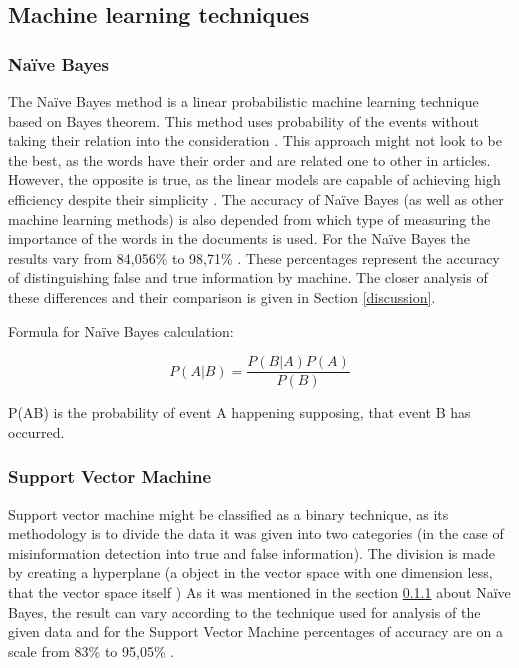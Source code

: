 \documentclass[11pt ,english,a4paper]{article}
\begin{document}
\subsection{Machine learning techniques} \label{tech:mach}

\subsubsection{Naïve Bayes}\label{nb}
The Naïve Bayes method is a linear probabilistic machine learning technique based on Bayes theorem. This method uses probability of the events without taking their relation into the consideration \cite{sha20mach}. This approach might not look to be the best, as the words have their order and are related one to other in articles. However, the opposite is true, as the linear models are capable of achieving high efficiency despite their simplicity \cite{pod19mach}. The accuracy of Naïve Bayes (as well as other machine learning methods) is also depended from which type of measuring the importance of the words in the documents is used. For the Naïve Bayes the results vary from 84,056\% \cite{sha20mach} to 98,71\% \cite{bar21health}. These percentages represent the accuracy of distinguishing false and true information by machine. The closer analysis of these differences and their comparison is given in Section \ref{discussion}.

Formula for Naïve Bayes calculation: \cite{sha20mach}

\begin{equation}
P(A|B) = \frac{P(B|A)P(A)}{P(B)}
\end{equation}

P(A\textbar B) is the probability of event A happening supposing, that event B has occurred.

\subsubsection{Support Vector Machine}\label{svm}
Support vector machine might be classified as a binary technique, as its methodology is to divide the data it was given into two categories \cite{pod19mach} (in the case of misinformation detection into true and false information). The division is made by creating a hyperplane (a object in the vector space with one dimension less, that the vector space itself \cite{sha20mach})
As it was mentioned in the section \ref{nb} about Naïve Bayes, the result can vary according to the technique used for analysis of the given data and for the Support Vector Machine percentages of accuracy are on a scale from 83\% \cite{chap22unmask} to 95,05\% \cite{sha20mach}.
\end{document}
